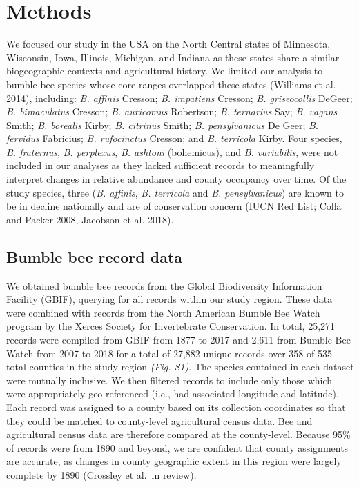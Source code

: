 \documentclass[11pt,]{article}
\begin{document}
\hypertarget{methods}{%
\section{Methods}\label{methods}}

We focused our study in the USA on the North Central states of
Minnesota, Wisconsin, Iowa, Illinois, Michigan, and Indiana as these
states share a similar biogeographic contexts and agricultural history.
We limited our analysis to bumble bee species whose core ranges
overlapped these states (Williams et al. 2014), including: \emph{B.
affinis} Cresson; \emph{B. impatiens} Cresson; \emph{B. griseocollis}
DeGeer; \emph{B. bimaculatus} Cresson; \emph{B. auricomus} Robertson;
\emph{B. ternarius} Say; \emph{B. vagans} Smith; \emph{B. borealis}
Kirby; \emph{B. citrinus} Smith; \emph{B. pensylvanicus} De Geer;
\emph{B. fervidus} Fabricius; \emph{B. rufocinctus} Cresson; and
\emph{B. terricola} Kirby. Four species, \emph{B. fraternus}, \emph{B.
perplexus}, \emph{B. ashtoni} (bohemicus), and \emph{B. variabilis},
were not included in our analyses as they lacked sufficient records to
meaningfully interpret changes in relative abundance and county
occupancy over time. Of the study species, three (\emph{B. affinis},
\emph{B. terricola} and \emph{B. pensylvanicus}) are known to be in
decline nationally and are of conservation concern (IUCN Red List; Colla
and Packer 2008, Jacobson et al. 2018).

\hypertarget{bumble-bee-record-data}{%
\subsection{Bumble bee record data}\label{bumble-bee-record-data}}

We obtained bumble bee records from the Global Biodiversity Information
Facility (GBIF), querying for all records within our study region. These
data were combined with records from the North American Bumble Bee Watch
program by the Xerces Society for Invertebrate Conservation. In total,
25,271 records were compiled from GBIF from 1877 to 2017 and 2,611 from
Bumble Bee Watch from 2007 to 2018 for a total of 27,882 unique records
over 358 of 535 total counties in the study region \emph{(Fig. S1)}. The
species contained in each dataset were mutually inclusive. We then
filtered records to include only those which were appropriately
geo-referenced (i.e., had associated longitude and latitude). Each
record was assigned to a county based on its collection coordinates so
that they could be matched to county-level agricultural census data. Bee
and agricultural census data are therefore compared at the county-level.
Because 95\% of records were from 1890 and beyond, we are confident that
county assignments are accurate, as changes in county geographic extent
in this region were largely complete by 1890 (Crossley et al.~in
review).
\end{document}

